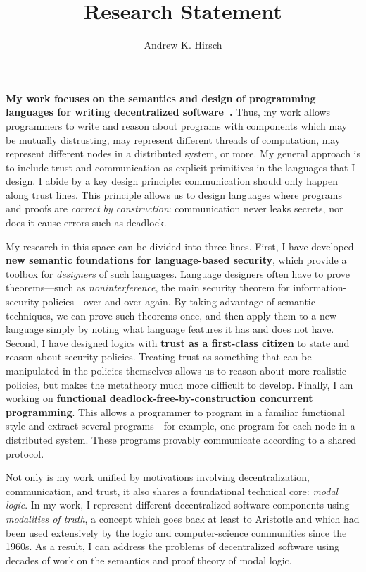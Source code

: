 \documentclass{article}
\author{Andrew K. Hirsch}
\title{Research Statement}
\date{}
\theoremstyle{definition}
\begin{document}
\maketitle

\textbf{My work focuses on the semantics and design of programming languages for writing decentralized software~\citep{SilverHHCZ22,MenzHLG22,HirschG22,HirschC21,HirschACAT20,HirschT18,HirschC13}.}
Thus, my work allows programmers to write and reason about programs with components which may be mutually distrusting, may represent different threads of computation, may represent different nodes in a distributed system, or more.
My general approach is to include trust and communication as explicit primitives in the languages that I design.
I abide by a key design principle: communication should only happen along trust lines.
This principle allows us to design languages where programs and proofs are \emph{correct by construction}: communication never leaks secrets, nor does it cause errors such as deadlock.

My research in this space can be divided into three lines.
First, I have developed \textbf{new semantic foundations for language-based security}, which provide a toolbox for \emph{designers} of such languages.
Language designers often have to prove theorems---such as \emph{noninterference}, the main security theorem for information-security policies---over and over again.
By taking advantage of semantic techniques, we can prove such theorems once, and then apply them to a new language simply by noting what language features it has and does not have.
Second, I have designed logics with \textbf{trust as a first-class citizen} to state and reason about security policies.
Treating trust as something that can be manipulated in the policies themselves allows us to reason about more-realistic policies, but makes the metatheory much more difficult to develop.
Finally, I am working on \textbf{functional deadlock-free-by-construction concurrent programming}.
This allows a programmer to program in a familiar functional style and extract several programs---for example, one program for each node in a distributed system.
These programs provably communicate according to a shared protocol.

Not only is my work unified by motivations involving decentralization, communication, and trust, it also shares a foundational technical core: \emph{modal logic}.
In my work, I represent different decentralized software components using \emph{modalities of truth}, a concept which goes back at least to Aristotle and which had been used extensively by the logic and computer-science communities since the 1960s.
As a result, I can address the problems of decentralized software using decades of work on the semantics and proof theory of modal logic.
\end{document}
